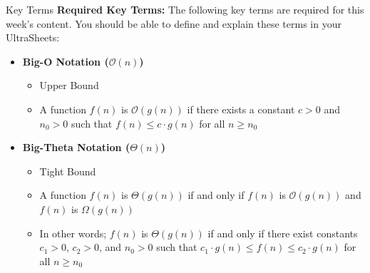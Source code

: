 \documentclass[hyperref={colorlinks,citecolor=blue,linkcolor=blue,urlcolor=blue}, aspectratio=1610]{beamer}
\begin{document}
\begin{frame}{Key Terms}
  \textbf{Required Key Terms:} The following key terms are required for this week's content. You should be able to define and explain these terms in your UltraSheets\texttrademark{}:
    \begin{itemize} 

      \item \textbf{Big-O Notation ($\mathcal{O}(n)$)}
      \begin{itemize}
        \item Upper Bound
        \item A function $f(n)$ is $\mathcal{O}(g(n))$ if there exists a constant $c > 0$ and $n_0 > 0$ such that $f(n) \leq c \cdot g(n)$ for all $n \geq n_0$
      \end{itemize}
      \pause
      \item \textbf{Big-Theta Notation ($\Theta(n)$)}
      \begin{itemize}
        \item Tight Bound
        \item A function $f(n)$ is $\Theta(g(n))$ if and only if $f(n)$ is $\mathcal{O}(g(n))$ and $f(n)$ is $\Omega(g(n))$
        \item In other words; $f(n)$ is $\Theta(g(n))$ if and only if there exist constants $c_1 > 0$, $c_2 > 0$, and $n_0 > 0$ such that $c_1 \cdot g(n) \leq f(n) \leq c_2 \cdot g(n)$ for all $n \geq n_0$
        
      \end{itemize}
    \end{itemize}    
\end{frame}
\end{document}
